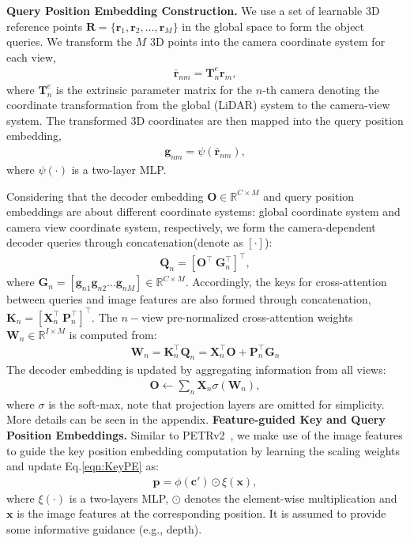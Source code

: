 \documentclass[10pt,twocolumn,letterpaper]{article}
\begin{document}
\vspace{2mm}
\noindent\textbf{Query Position Embedding Construction.}
We use a set of learnable $3$D reference points 
$\mathbf{R} = \{\mathbf{r}_1, \mathbf{r}_2,
\dots, \mathbf{r}_M\}$ in the global space 
to form the object queries. We transform the $M$ $3$D points
into the camera coordinate system for each view,
\begin{align}
    \bar{\mathbf{r}}_{nm}
    = \mathbf{T}_{n}^{e}\mathbf{r}_m,
\end{align}
where $\mathbf{T}_{n}^{e}$ is the extrinsic parameter matrix
for the $n$-th camera denoting the coordinate transformation from the global (LiDAR) system to the camera-view system.
The transformed $3$D coordinates
are then mapped into 
the query position embedding,
\begin{align}
    \mathbf{g}_{nm} = \psi(\bar{\mathbf{r}}_{nm}),
    \label{eqn:QPE}
\end{align}
where $\psi(\cdot)$ is a two-layer MLP.

Considering that
the decoder embedding $\mathbf{O}\in \mathbb{R}^{C\times M}$
and query position embeddings
are about different coordinate systems:
global coordinate system
and camera view coordinate system,
respectively,
we form the camera-dependent decoder queries
through concatenation(denote as $[\cdot]$):
\begin{align}
    \mathbf{Q}_n =[\mathbf{O}^\top~\mathbf{G}_n^\top]^\top,
\end{align}
where $\mathbf{G}_n = [\mathbf{g}_{n1} \mathbf{g}_{n2}\dots \mathbf{g}_{nM}]\in \mathbb{R}^{C\times M}$.
Accordingly,
the keys for cross-attention between queries and image features
are also formed through concatenation, 
$\mathbf{K}_n = [\mathbf{X}_{n}^\top~\mathbf{P}_{n}^\top]^\top$.
The $n-$view pre-normalized cross-attention weights $\mathbf{W}_n \in \mathbb{R}^{I\times M}$
is computed from:
\begin{align}
    \mathbf{W}_n = \mathbf{K}_n^\top \mathbf{Q}_n = \mathbf{X}_n^\top\mathbf{O} + \mathbf{P}_{n}^\top \mathbf{G}_{n}
\end{align}
The decoder embedding is updated by aggregating information from all views:
\begin{align}
\mathbf{O} \xleftarrow{}{} \sum_n \mathbf{X}_n\sigma(\mathbf{W}_n),
\end{align}
where $\sigma$ is the soft-max, note that projection layers are omitted for simplicity. More details can be seen in the appendix.
\noindent\textbf{Feature-guided Key and Query Position Embeddings.}
Similar to PETRv2~\cite{liu2022petrv2},
we make use of the image features to guide the key position embedding computation by learning the scaling weights
and update Eq.\ref{eqn:KeyPE} as:
\begin{align}
    \mathbf{p}
    = \phi(\mathbf{c}')\odot\xi(\mathbf{x}),
    \label{eqn:FGPC}
\end{align}
where $\xi(\cdot)$ is a two-layers MLP, $\odot$ denotes the element-wise multiplication and $\mathbf{x}$
is the image features at the corresponding position.
It is assumed to
provide some informative guidance
(e.g., depth). 
\end{document}

